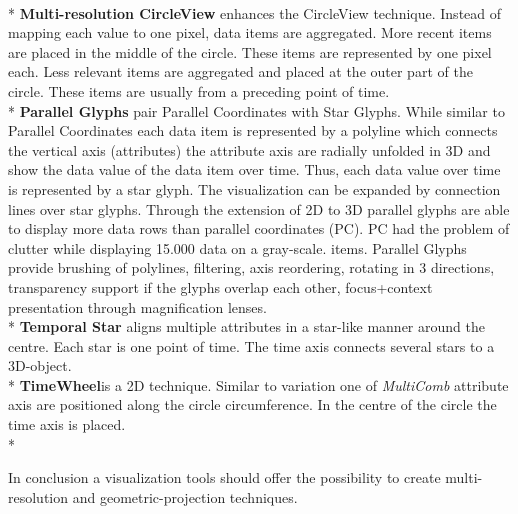 \\*
\textbf{Multi-resolution CircleView} enhances the CircleView technique. Instead of mapping each value to one pixel, data items are aggregated. More recent items are placed in the middle of the circle. These items are represented by one pixel each. Less relevant items are aggregated and placed at the outer part of the circle. These items are usually from a preceding point of time.
\\*
\textbf{Parallel Glyphs} pair Parallel Coordinates with Star Glyphs. While similar to Parallel Coordinates each data item is represented by a polyline which connects the vertical axis (attributes) the attribute axis are radially unfolded in 3D and show the data value of the data item over time. Thus, each data value over time is represented by a star glyph. The visualization can be expanded by connection lines over star glyphs. Through the extension of 2D to 3D parallel glyphs are able to display more data rows than parallel coordinates (PC). PC had the problem of clutter while displaying 15.000 data on a gray-scale.  items\cite{Keimb}.
Parallel Glyphs provide brushing of polylines, filtering, axis reordering, rotating in 3 directions, transparency support if the glyphs overlap each other, focus+context presentation through magnification lenses.
\\*
\textbf{Temporal Star} aligns multiple attributes in a star-like manner around the centre. Each star is one point of time. The time axis connects several stars to a 3D-object.
\\*
\textbf{TimeWheel}is a 2D technique. Similar to variation one of \textit{MultiComb} attribute axis are positioned along the circle circumference. In the centre of the circle the time axis is placed. 
\\*

In conclusion a visualization tools should offer the possibility to create multi-resolution and geometric-projection techniques. 

